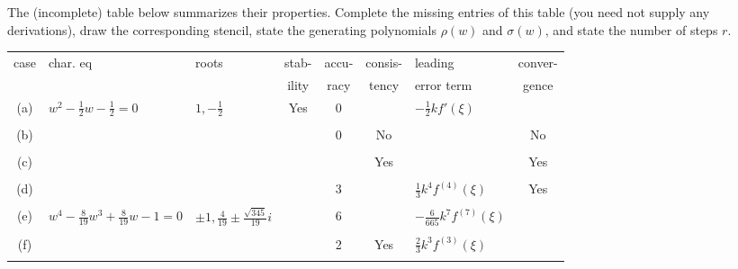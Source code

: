\documentclass[final,oneside,onecolumn]{article}
\begin{document}
\begin{enumerate}
The (incomplete) table below summarizes their properties.  Complete the missing
entries of this table (you need not supply any derivations), draw the corresponding
stencil, state the generating polynomials $\rho(w)$ and $\sigma(w)$, and state
the number of steps $r$.
\begin{center}
\begin{tabular}{|c|l|l|c|c|c|l|c|}
\hline
case & char. eq & roots & stab-   & accu- & consis- & leading & conver- \\
     &          &       & ility & racy  & tency   & error term & gence \\
\hline
(a)  & $w^2 - \frac{1}{2}w - \frac{1}{2}=0$ & $1,-\frac{1}{2}$ & Yes & 
0 &  & $-\frac{1}{2}k f'(\xi)$ & \\
& & & & & & & \\
(b)  &  & & & 0 & No  & & No \\
& & & & & & & \\
(c)  &  &  &  &   & Yes  &  & Yes \\
& & & & & & & \\
(d)  &  &  &  & 3 &      & $\frac{1}{3}k^4 f^{(4)}(\xi)$ & Yes \\
& & & & & & & \\
(e)  & $w^4 - \frac{8}{19}w^3 + \frac{8}{19}w-1=0$ & $\pm 1,\frac{4}{19}\pm \frac{\sqrt{345}}{19}i$ &  & 
6 &  & $-\frac{6}{665}k^7 f^{(7)}(\xi)$ & \\
& & & & & & & \\
(f)  &  &  &  & 2 & Yes & $\frac{2}{3}k^3 f^{(3)}(\xi)$ & \\
& & & & & & & \\
\hline
\end{tabular}
\end{center}
\bigbreak


\end{enumerate}
\end{document}

